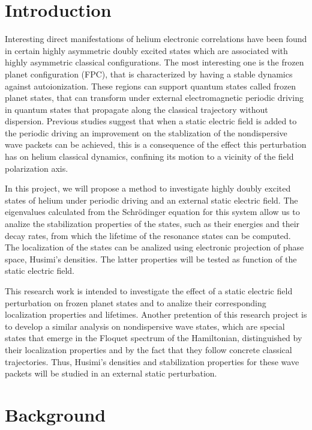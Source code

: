 \section{Introduction}
Interesting direct manifestations of helium electronic correlations have been found in certain highly asymmetric doubly excited states which are associated with highly asymmetric classical configurations. The most interesting one is the frozen planet configuration (FPC), that is characterized by having a stable dynamics against autoionization. These regions can support quantum states called frozen planet states, that can transform under external electromagnetic periodic driving in quantum states that propagate along the classical trajectory without dispersion. Previous studies suggest that when a static electric field is added to the periodic driving an improvement on the stablization of the nondispersive wave packets can be achieved, this is a consequence of the effect this perturbation has on helium classical dynamics, confining its motion to a vicinity of the field polarization axis.

In this project, we will propose a method to investigate highly doubly excited states of helium under periodic driving and an external static electric field. The eigenvalues calculated from the Schr\"odinger equation for this system allow us to analize the stabilization properties of the states, such as their energies and their decay rates, from which the lifetime of the resonance states can be computed. The localization of the states can be analized using electronic projection of phase space, Husimi's densities. The latter properties will be tested as function of the static electric field.

This research work is intended to investigate the effect of a static electric field perturbation on frozen planet states and to analize their corresponding localization properties and lifetimes. Another pretention of this research project is to develop a similar analysis on nondispersive wave states, which are special states that emerge in the Floquet spectrum of the Hamiltonian, distinguished by their localization properties and by the fact that they follow concrete classical trajectories. Thus, Husimi's densities and stabilization properties for these wave packets will be studied in an external static perturbation.

\section{Background}

